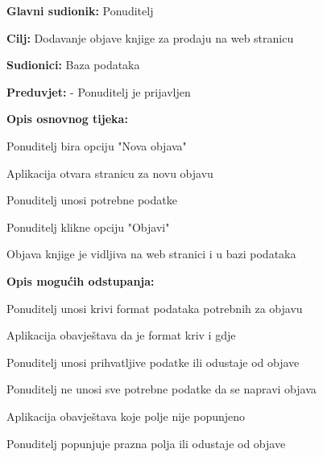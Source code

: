                     \noindent {}
					\begin{packed_item}
	
						\item \textbf{Glavni sudionik: } Ponuditelj
						\item  \textbf{Cilj:} Dodavanje objave knjige za prodaju na web stranicu
						\item  \textbf{Sudionici:} Baza podataka
						\item  \textbf{Preduvjet:} - Ponuditelj je prijavljen
						\item  \textbf{Opis osnovnog tijeka:}
						
						\item[] \begin{packed_enum}
	
							\item Ponuditelj bira opciju "Nova objava"
                            \item Aplikacija otvara stranicu za novu objavu
                            \item Ponuditelj unosi potrebne podatke
							\item Ponuditelj klikne opciju "Objavi"
                            \item Objava knjige je vidljiva na web stranici i u bazi podataka
						\end{packed_enum}
						
						\item  \textbf{Opis mogućih odstupanja:}
						
						\item[] \begin{packed_item}
	
							\item[2.a] Ponuditelj unosi krivi format podataka potrebnih za objavu
							\item[] \begin{packed_enum}
								
								\item Aplikacija obavještava da je format kriv i gdje
								\item Ponuditelj unosi prihvatljive podatke ili odustaje od objave
							\end{packed_enum}
                            \item[2.b] Ponuditelj ne unosi sve potrebne podatke da se napravi objava
                             \item[] \begin{packed_enum}
                                 \item Aplikacija obavještava koje polje nije popunjeno
                                 \item Ponuditelj popunjuje prazna polja ili odustaje od objave
                             \end{packed_enum}
						\end{packed_item}
					\end{packed_item}

